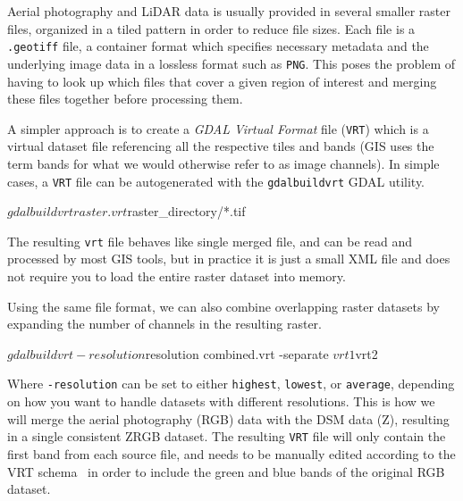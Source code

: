 Aerial photography and LiDAR data is usually provided in several smaller raster files, organized in a tiled pattern in order to reduce file sizes.
Each file is a \texttt{.geotiff} file, a container format which specifies necessary metadata and the underlying image data in a lossless format such as \texttt{PNG}.
This poses the problem of having to look up which files that cover a given region of interest and merging these files together before processing them.

A simpler approach is to create a \textit{GDAL Virtual Format} file (\texttt{VRT}) which is a virtual dataset file referencing all the respective tiles and bands (GIS uses the term bands for what we would otherwise refer to as image channels).
In simple cases, a \texttt{VRT} file can be autogenerated with the \texttt{gdalbuildvrt} GDAL utility.

\begin{shellcode}
$ gdalbuildvrt raster.vrt ${raster_directory}/*.tif
\end{shellcode}
%
The resulting \texttt{vrt} file behaves like single merged file, and can be read and processed by most GIS tools, but in practice it is just a small XML file and does not require you to load the entire raster dataset into memory.

Using the same file format, we can also combine overlapping raster datasets by expanding the number of channels in the resulting raster.

\begin{shellcode}
$ gdalbuildvrt -resolution ${resolution} combined.vrt -separate ${vrt1} ${vrt2} 
\end{shellcode}
%
Where \texttt{-resolution} can be set to either \texttt{highest}, \texttt{lowest}, or \texttt{average}, depending on how you want to handle datasets with different resolutions.
This is how we will merge the aerial photography (RGB) data with the DSM data (Z), resulting in a single consistent ZRGB dataset.
The resulting \texttt{VRT} file will only contain the first band from each source file, and needs to be manually edited according to the VRT schema~\cite{vrt_schema_2015} in order to include the green and blue bands of the original RGB dataset.
